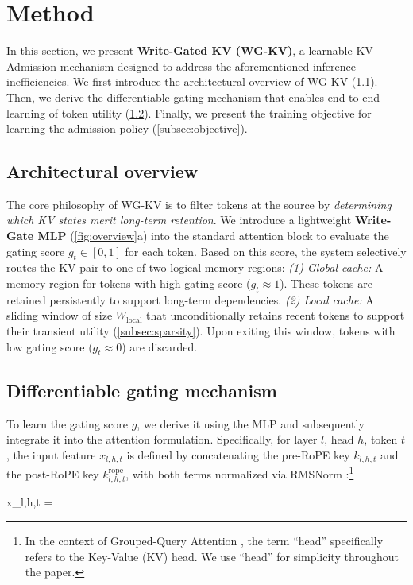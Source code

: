 \section{Method}
In this section, we present \textbf{Write-Gated KV (WG-KV)}, a learnable KV Admission mechanism designed to address the aforementioned inference inefficiencies. We first introduce the architectural overview of WG-KV (\cref{subsec:arch}). Then, we derive the differentiable gating mechanism that enables end-to-end learning of token utility (\cref{subsec:gate}). Finally, we present the training objective for learning the admission policy (\cref{subsec:objective}).

\subsection{Architectural overview}
\label{subsec:arch}


The core philosophy of WG-KV is to filter tokens at the source by \textit{determining which KV states merit long-term retention}. We introduce a lightweight \textbf{Write-Gate MLP} (\cref{fig:overview}a) into the standard attention block to evaluate the gating score $g_{t} \in [0, 1]$ for each token. Based on this score, the system selectively routes the KV pair to one of two logical memory regions: \textit{(1) Global cache:} A memory region for tokens with high gating score ($g_{t} \approx 1$). These tokens are retained persistently to support long-term dependencies. \textit{(2) Local cache:} A sliding window of size $W_{\text{local}}$ that unconditionally retains recent tokens to support their transient utility (\cref{subsec:sparsity}). Upon exiting this window, tokens with low gating score ($g_{t} \approx 0$) are discarded.

\subsection{Differentiable gating mechanism}
\label{subsec:gate}

To learn the gating score $g$, we derive it using the MLP and subsequently integrate it into the attention formulation. Specifically, for layer $l$, head $h$, token $t$, the input feature $x_{l,h,t}$ is defined by concatenating the pre-RoPE key $k_{l,h,t}$ and the post-RoPE key $k_{l,h,t}^{\text{rope}}$, with both terms normalized via RMSNorm \cite{rope,rmsnorm}:\footnote{In the context of Grouped-Query Attention \cite{gqa}, the term ``head'' specifically refers to the Key-Value (KV) head. We use ``head'' for simplicity throughout the paper.}
\begin{myEquation}
    x_{l,h,t} = 
\end{myEquation}


